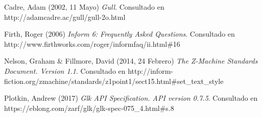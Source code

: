 \documentclass[a4paper,12pt]{article}
\numberwithin{equation}{section}
\begin{document}

\begin{thebibliography}{4}

	 Cadre, Adam (2002, 11 Mayo) \emph{Gull}. Consultado en http://adamcadre.ac/gull/gull-2o.html

	 Firth, Roger (2006) \emph{Inform 6: Frequently Asked Questions}. Consultado en http://www.firthworks.com/roger/informfaq/ii.html\#16

	 Nelson, Graham \& Fillmore, David (2014, 24 Febrero) \emph{The Z-Machine Standards Document. Version 1.1}. Consultado en http://inform-fiction.org/zmachine/standards/z1point1/sect15.html\#set\_text\_style

	 Plotkin, Andrew (2017) \emph{Glk API Specification. API version 0.7.5}. Consultado en https://eblong.com/zarf/glk/glk-spec-075\_4.html\#s.8

\end{thebibliography}


\end{document}
